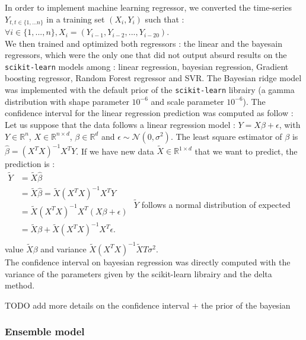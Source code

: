 In order to implement machine learning regressor, we converted the time-series $Y_{t,  t \in \{1, \hdots n\}}$ in a training set $(X_i, Y_i)$ such that : \\
$\forall i \in \{1, ..., n\}, X_i = (Y_{i-1}, Y_{i-2}, ..., Y_{i-20})$.\\

We then trained and optimized both regressors : the linear and the bayesain regressors, which were the only one that did not output absurd results on the \texttt{scikit-learn} models among : linear regression, bayesian regression, Gradient boosting regressor, Random Forest regressor and SVR. 
The Bayesian ridge model was implemented with the default prior of the \texttt{scikit-learn} librairy (a gamma distribution with shape parameter $10^{-6}$ and scale parameter $10^{-6}$).
The confidence interval for the linear regression prediction was computed as follow : \\
Let us suppose that the data follows a linear regression model : $Y = X\beta + \epsilon$, with $Y \in \mathbb{R}^n$, $X \in \mathbb{R}^{n \times d}$, $\beta \in \mathbb{R}^d$ and $\epsilon \sim \mathcal{N}(0, \sigma^2)$.
The least square estimator of $\beta$ is $\hat{\beta} = (X^T X)^{-1} X^T Y$.
If we have new data $\tilde{X} \in \mathbb{R}^{1 \times d}$ that we want to predict, the prediction is  : \\

$
\begin{aligned}
    \tilde{Y} & = \tilde{X} \hat{\beta} \\
    &  = \tilde{X} \hat{\beta} = \tilde{X} (X^T X)^{-1} X^T Y \\
    &  = \tilde{X} (X^T X)^{-1} X^T (X\beta + \epsilon) \\
    &  = \tilde{X} \beta + \tilde{X} (X^T X)^{-1} X^T \epsilon.\\
\end{aligned}
$
\newline
$\tilde{Y}$ follows a normal distribution of expected value $\tilde{X} \beta$ and variance $\tilde{X} (X^T X)^{-1} \tilde{X}T \sigma ^2$.\\
The confidence interval on bayesian regression was directly computed with the variance of the parameters given by the scikit-learn librairy and the delta method. 

TODO add more details on the confidence interval + the prior of the bayesian 
\subsubsection{Ensemble model}

